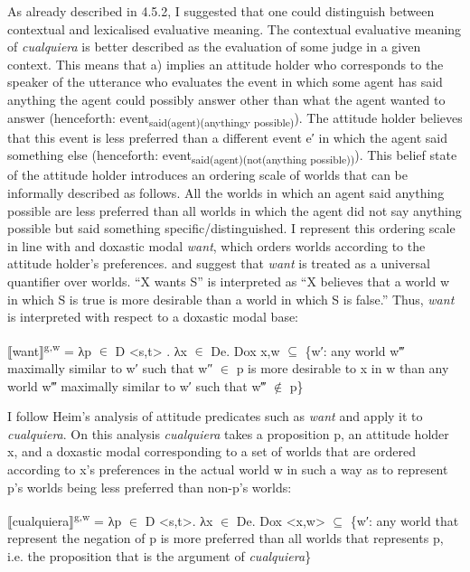 \documentclass[output=paper]{langscibook}
\begin{document}
  As already described in 4.5.2, I suggested that one could distinguish between contextual and lexicalised evaluative meaning. The contextual evaluative meaning of \textit{cualquiera} is better described as the evaluation of some judge in a given context. This means that a) implies an attitude holder who corresponds to the speaker of the utterance who evaluates the event in which some agent has said anything the agent could possibly answer other than what the agent wanted to answer (henceforth: event\textsubscript{said(agent)(anythingy possible)}). The attitude holder believes that this event is less preferred than a different event e′ in which the agent said something else (henceforth: event\textsubscript{said(agent)(not(anything possible))}). This belief state of the attitude holder introduces an ordering scale of worlds that can be informally described as follows. All the worlds in which an agent said anything possible are less preferred than all worlds in which the agent did not say anything possible but said something specific/distinguished. I represent this ordering scale in line with \citet{Stalnaker1984} and  doxastic modal \textit{want}, which orders worlds according to the attitude holder’s preferences. \citet{Stalnaker1984} and \citet{Heim1992} suggest that \textit{want} is treated as a universal quantifier over worlds. “X wants S” is interpreted as “X believes that a world w in which S is true is more desirable than a world in which S is false.” Thus, \textit{want} is interpreted with respect to a doxastic modal base: 

    ⟦want⟧\textsuperscript{g,w} = λp ${\in}$ D <s,t> . λx ${\in}$ De. Dox x,w ${\subseteq}$ \{w′: any world w‴ maximally similar to w′ such that w″ ${\in}$ p is more desirable to x in w than any world w‴ maximally similar to w′ such that w‴ ${\notin}$ p\}  

    \citep[193]{Heim1992}

I follow Heim’s analysis of attitude predicates such as \textit{want} and apply it to \textit{cualquiera}. On this analysis \textit{cualquiera} takes a proposition p, an attitude holder x, and a doxastic modal corresponding to a set of worlds that are ordered according to x’s preferences in the actual world w in such a way as to represent p’s worlds being less preferred than non-p’s worlds:

\label{bkm:Ref150787526}    ⟦cualquiera⟧\textsuperscript{g,w} = λp ${\in}$ D <s,t>. λx ${\in}$ De. Dox <x,w> ${\subseteq}$ \{w′: any world that represent the negation of p is more preferred than all worlds that represents p, i.e. the proposition that is the argument of \textit{cualquiera}\}  
\end{document}
